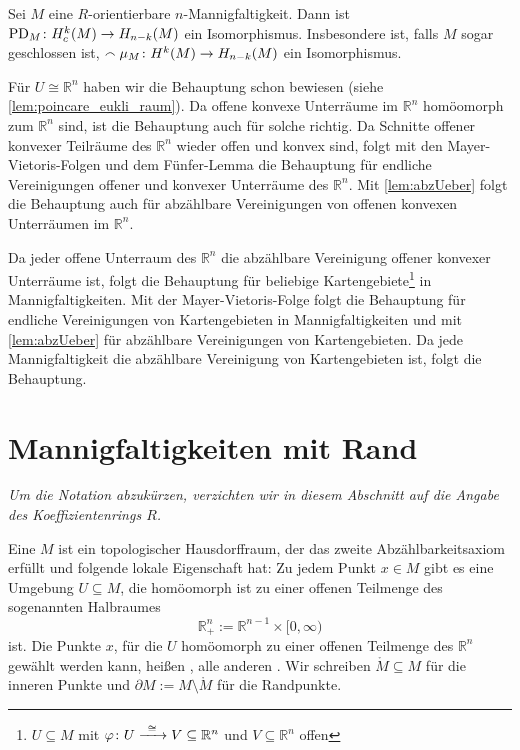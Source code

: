 \begin{satz}[{name=[Poincarés Dualitätssatz]}]
	Sei $M$ eine $R$-orientierbare $n$-Mannigfaltigkeit. 
	Dann ist $\operatorname{PD}_M \colon H^k_c(M) \to H_{n-k}(M)$ ein Isomorphismus.
	Insbesondere ist, falls $M$ sogar geschlossen ist, $\smallfrown \mu_M \colon H^k(M) \to H_{n-k}(M)$ ein Isomorphismus.
\end{satz}
\begin{beweis}
	Für $U \cong \mathbb{R}^n$ haben wir die Behauptung schon bewiesen (siehe \autoref{lem:poincare_eukli_raum}).
	Da offene konvexe Unterräume im $\mathbb{R}^n$ homöomorph zum $\mathbb{R}^n$ sind, ist die Behauptung auch für solche richtig.
	Da Schnitte offener konvexer Teilräume des $\mathbb{R}^n$ wieder offen und konvex sind, folgt mit den Mayer-Vietoris-Folgen und dem Fünfer-Lemma die Behauptung für endliche Vereinigungen offener und konvexer Unterräume des $\mathbb{R}^n$.
	Mit \autoref{lem:abzUeber} folgt die Behauptung auch für abzählbare Vereinigungen von offenen konvexen Unterräumen im $\mathbb{R}^n$.
	
	Da jeder offene Unterraum des $\mathbb{R}^n$ die abzählbare Vereinigung offener konvexer Unterräume ist, folgt die Behauptung für beliebige Kartengebiete\footnote{$U \subseteq M$ mit $\varphi \colon U \grenzw{\cong} V \subseteq \mathbb{R}^n$ und $V \subseteq \mathbb{R}^n$ offen} in Mannigfaltigkeiten.
	Mit der Mayer-Vietoris-Folge folgt die Behauptung für endliche Vereinigungen von Kartengebieten in Mannigfaltigkeiten und mit \autoref{lem:abzUeber} für abzählbare Vereinigungen von Kartengebieten.
	Da jede Mannigfaltigkeit die abzählbare Vereinigung von Kartengebieten ist, folgt die Behauptung.
\end{beweis}
\newpage

\section{Mannigfaltigkeiten mit Rand} %
\label{sec:9}

\emph{Um die Notation abzukürzen, verzichten wir in diesem Abschnitt auf die Angabe des Koeffizientenrings $R$.}

\begin{definition}[{name=[Mannigfaltigkeit mit Rand]}]
	Eine  $M$ ist ein topologischer Hausdorffraum, der das zweite Abzählbarkeitsaxiom erfüllt und folgende lokale Eigenschaft hat: 
	Zu jedem Punkt $x \in M$ gibt es eine Umgebung $U \subseteq M$, die homöomorph ist zu einer offenen Teilmenge des sogenannten Halbraumes 
	\[
		\mathbb{R}^n_+ := \mathbb{R}^{n-1} \times [0,\infty)
	\]
	ist.
	Die Punkte $x$, für die $U$ homöomorph zu einer offenen Teilmenge des $\mathbb{R}^n$ gewählt werden kann, heißen , alle anderen .
	Wir schreiben $\mathring{M} \subseteq M$ für die inneren Punkte und $\partial M := M \setminus \mathring{M}$ für die Randpunkte.  
\end{definition}

